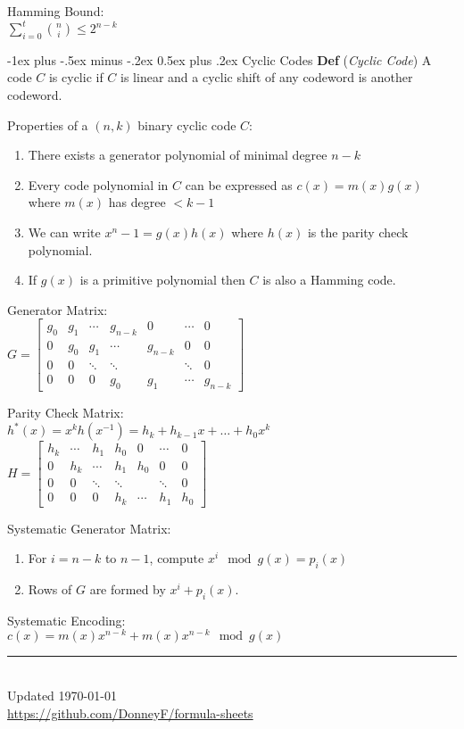 \documentclass[12pt,landscape]{article}
\makeatletter
\renewcommand{\section}{\@startsection{section}{1}{0mm}%
                                {-1ex plus -.5ex minus -.2ex}%
                                {0.5ex plus .2ex}%
                                {\normalfont\normalsize\bfseries}}
\newcommand{\tab}{\hspace{.02\textwidth}}
\newcommand{\ds}{\displaystyle}
\newcommand{\defn}[1]{\textbf{Def} (\emph{#1})}
\makeatother
\begin{document}
\begin{multicols*}{3}
Hamming Bound:\\
\tab $\ds \sum_{i=0}^{t} {n \choose i} \leq 2^{n-k}$

\section{Cyclic Codes}
\defn{Cyclic Code} A code $C$ is cyclic if $C$ is linear and a cyclic shift of any codeword is another codeword.

Properties of a $(n,k)$ binary cyclic code $C$:\\
\begin{enumerate}[itemsep=0em]
	\item There exists a generator polynomial of minimal degree $n-k$
	\item Every code polynomial in $C$ can be expressed as $c(x) = m(x)g(x)$ where $m(x)$ has degree $< k-1$
	\item We can write $x^n-1 = g(x)h(x)$ where $h(x)$ is the parity check polynomial.
	\item If $g(x)$ is a primitive polynomial then $C$ is also a Hamming code.
\end{enumerate}

Generator Matrix:\\
\tab $G = \begin{bmatrix}
	g_0 & g_1 & \cdots & g_{n-k} & 0 & \cdots & 0\\
	0 & g_0 & g_1 & \cdots & g_{n-k} & 0 & 0\\
	0 & 0 & \ddots & \ddots & & \ddots & 0\\
	0 & 0 & 0 & g_0 & g_1 & \cdots & g_{n-k}
\end{bmatrix}$

Parity Check Matrix:\\
\tab $h^*(x) = x^kh(x^{-1}) = h_k + h_{k-1}x + \ldots + h_0x^k$\\
\tab $H = \begin{bmatrix}
	h_k & \cdots & h_1 & h_0 & 0 & \cdots & 0\\
	0 & h_k & \cdots & h_1 & h_0 & 0 & 0\\
	0 & 0 & \ddots & \ddots & & \ddots & 0\\
	0 & 0 & 0 & h_k & \cdots & h_1 & h_0
\end{bmatrix}$

Systematic Generator Matrix:\\
\begin{enumerate}[itemsep=0em]
	\item For $i = n-k$ to $n-1$, compute $x^i \mod g(x) = p_i(x)$
	\item Rows of $G$ are formed by $x^i + p_i(x)$.
\end{enumerate}

Systematic Encoding:\\
\tab $c(x) = m(x)x^{n-k} + m(x)x^{n-k}\mod g(x)$

\rule{0.3\linewidth}{0.25pt}
\scriptsize\\
Updated \today\\
\href{https://github.com/DonneyF/formula-sheets}{https://github.com/DonneyF/formula-sheets}
\end{multicols*}
\end{document}

